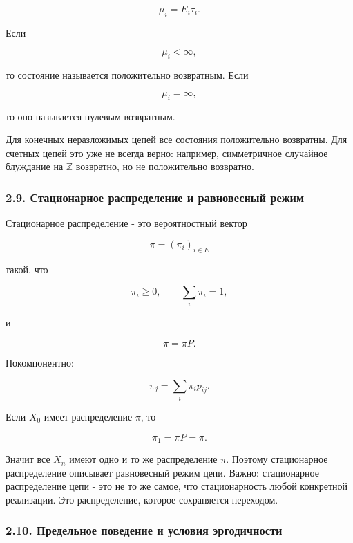 \documentclass[
  11pt,
  a4paper,
]{article}
\begin{document}
\[
\mu_i=E_i\tau_i.
\]

Если

\[
\mu_i<\infty,
\]

то состояние называется положительно возвратным. Если

\[
\mu_i=\infty,
\]

то оно называется нулевым возвратным.

Для конечных неразложимых цепей все состояния положительно возвратны.
Для счетных цепей это уже не всегда верно: например, симметричное
случайное блуждание на \(\mathbb Z\) возвратно, но не положительно
возвратно.

\subsubsection{2.9. Стационарное распределение и равновесный
режим}\label{ux441ux442ux430ux446ux438ux43eux43dux430ux440ux43dux43eux435-ux440ux430ux441ux43fux440ux435ux434ux435ux43bux435ux43dux438ux435-ux438-ux440ux430ux432ux43dux43eux432ux435ux441ux43dux44bux439-ux440ux435ux436ux438ux43c}

Стационарное распределение - это вероятностный вектор

\[
\pi=(\pi_i)_{i\in E}
\]

такой, что

\[
\pi_i\ge0,
\qquad
\sum_i\pi_i=1,
\]

и

\[
\pi=\pi P.
\]

Покомпонентно:

\[
\pi_j=\sum_i\pi_i p_{ij}.
\]

Если \(X_0\) имеет распределение \(\pi\), то

\[
\pi_1=\pi P=\pi.
\]

Значит все \(X_n\) имеют одно и то же распределение \(\pi\). Поэтому
стационарное распределение описывает равновесный режим цепи. Важно:
стационарное распределение цепи - это не то же самое, что стационарность
любой конкретной реализации. Это распределение, которое сохраняется
переходом.

\subsubsection{2.10. Предельное поведение и условия
эргодичности}\label{ux43fux440ux435ux434ux435ux43bux44cux43dux43eux435-ux43fux43eux432ux435ux434ux435ux43dux438ux435-ux438-ux443ux441ux43bux43eux432ux438ux44f-ux44dux440ux433ux43eux434ux438ux447ux43dux43eux441ux442ux438}
\end{document}
